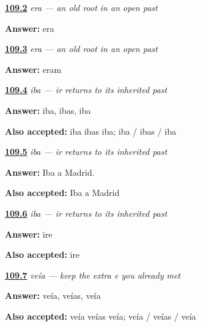 \noindent\begin{minipage}[t]{\linewidth}
\raggedright
\hyperlink{review-ES-C16-ser-imperfecto-era-fue}{\textbf{109.2}} \emph{era — an old root in an open past}\par
\small \textbf{Answer:} era\par
\end{minipage}\par\medskip

\noindent\begin{minipage}[t]{\linewidth}
\raggedright
\hyperlink{review-ES-C16-ser-imperfecto-history}{\textbf{109.3}} \emph{era — an old root in an open past}\par
\small \textbf{Answer:} eram\par
\end{minipage}\par\medskip

\noindent\begin{minipage}[t]{\linewidth}
\raggedright
\hyperlink{review-ES-C16-ir-imperfecto-singular-forms}{\textbf{109.4}} \emph{iba — ir returns to its inherited past}\par
\small \textbf{Answer:} iba, ibas, iba\par
\footnotesize \textbf{Also accepted:} iba ibas iba; iba / ibas / iba
\end{minipage}\par\medskip

\noindent\begin{minipage}[t]{\linewidth}
\raggedright
\hyperlink{review-ES-C16-ir-imperfecto-iba-madrid}{\textbf{109.5}} \emph{iba — ir returns to its inherited past}\par
\small \textbf{Answer:} Iba a Madrid.\par
\footnotesize \textbf{Also accepted:} Iba a Madrid
\end{minipage}\par\medskip

\noindent\begin{minipage}[t]{\linewidth}
\raggedright
\hyperlink{review-ES-C16-ir-imperfecto-history}{\textbf{109.6}} \emph{iba — ir returns to its inherited past}\par
\small \textbf{Answer:} īre\par
\footnotesize \textbf{Also accepted:} ire
\end{minipage}\par\medskip

\noindent\begin{minipage}[t]{\linewidth}
\raggedright
\hyperlink{review-ES-C16-ver-imperfecto-singular-forms}{\textbf{109.7}} \emph{veía — keep the extra e you already met}\par
\small \textbf{Answer:} veía, veías, veía\par
\footnotesize \textbf{Also accepted:} veía veías veía; veía / veías / veía
\end{minipage}\par\medskip

